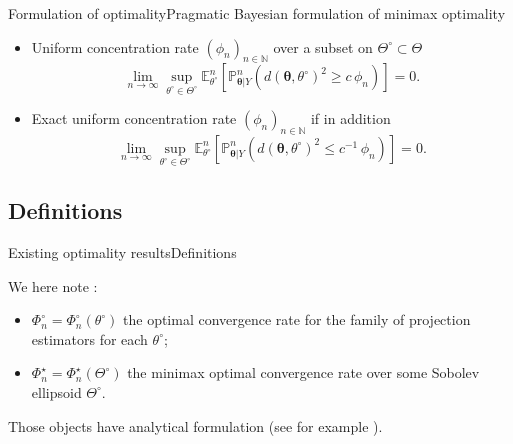 \documentclass[10pt]{beamer}
\begin{document}
\begin{frame}{Formulation of optimality}{Pragmatic Bayesian formulation of minimax optimality}
\begin{itemize}
\item Uniform concentration rate $(\phi_{n})_{n \in \mathbb{N}}$ over a subset on $\Theta^{\circ} \subset \Theta$
\[  \lim_{n \rightarrow \infty} \sup_{\theta^{\circ} \in \Theta^{\circ}} \mathbb{E}_{\theta^{\circ}}^{n}\left[ \mathbb{P}_{\boldsymbol{\theta}\vert Y}^{n} \left(d\left( \boldsymbol{\theta}, \theta^{\circ} \right)^{2} \geq c \, \phi_{n} \right) \right] = 0.\]

\item Exact uniform concentration rate $(\phi_{n})_{n \in \mathbb{N}}$ if in addition
\[ \lim_{n \rightarrow \infty} \sup_{\theta^{\circ} \in \Theta^{\circ}} \mathbb{E}_{\theta^{\circ}}^{n}\left[ \mathbb{P}_{\boldsymbol{\theta}\vert Y}^{n} \left(d\left( \boldsymbol{\theta}, \theta^{\circ} \right)^{2} \leq c^{-1} \, \phi_{n} \right) \right] = 0. \]

\end{itemize}
\end{frame}

\subsection{Definitions}
\begin{frame}{Existing optimality results}{Definitions}

We here note :
\begin{itemize}
\item $\Phi_{n}^{\circ} = \Phi_{n}^{\circ}\left(\theta^{\circ}\right)$ the optimal convergence rate for the family of projection estimators for each $\theta^{\circ}$;
\item $\Phi_{n}^{\star} = \Phi_{n}^{\star}\left(\Theta^{\circ}\right)$ the minimax optimal convergence rate over some Sobolev ellipsoid $\Theta^{\circ}$.
\end{itemize}
Those objects have analytical formulation (see for example \textbf{\citet{JJMS}}).

\end{frame}
\end{document}
